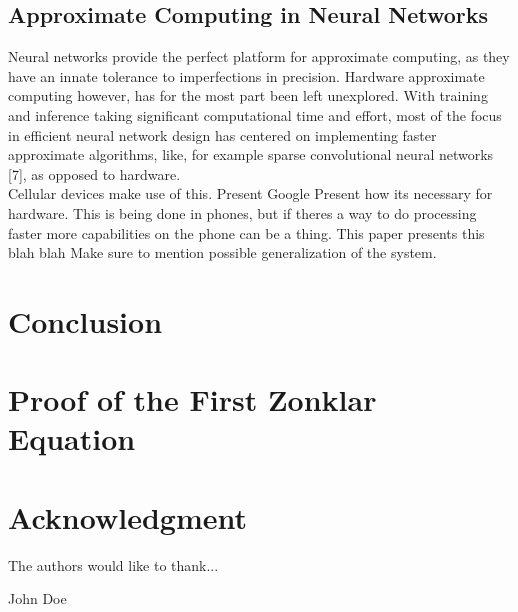 \documentclass[conference]{IEEEtran}
\begin{document}
\subsection{Approximate Computing in Neural Networks}
	Neural networks provide the perfect platform for approximate computing, as they have an innate tolerance to imperfections in precision. Hardware approximate computing however, has for the most part been left unexplored. With training and inference taking significant computational time and effort, most of the focus in efficient neural network design has centered on implementing faster approximate algorithms, like, for example sparse convolutional neural networks [7], as opposed to hardware.\\
	\indent Cellular devices make use of this. Present Google  
	Present how its necessary for hardware. This is being done in phones, but if theres a way to do processing faster more capabilities on the phone can be a thing.
	This paper presents this blah blah 
	Make sure to mention possible generalization of the system. 
\section{Conclusion}

\appendices
\section{Proof of the First Zonklar Equation}
\blindtext

\section*{Acknowledgment}


The authors would like to thank...

\ifCLASSOPTIONcaptionsoff
  \newpage
\fi


\begin{IEEEbiography}{John Doe}
\blindtext
\end{IEEEbiography}
\end{document}
